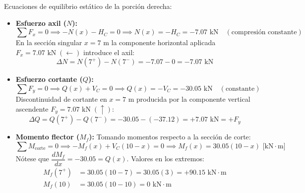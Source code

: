 Ecuaciones de equilibrio estático de la porción derecha:
\begin{itemize}
    \item \textbf{Esfuerzo axil ($N$):}
          \begin{equation}
              \sum F_x = 0 \implies -N(x) - H_C = 0 \implies \boxed{N(x) = -H_C = -7.07\text{ kN}} \quad (\text{compresión constante})
          \end{equation}
          En la sección singular $x = 7\text{ m}$ la componente horizontal aplicada $F_x = 7.07\text{ kN}\;(\leftarrow)$ introduce el axil:
          \begin{equation}
              \Delta N = N(7^+) - N(7^-) = -7.07 - 0 = -7.07\text{ kN}
          \end{equation}

    \item \textbf{Esfuerzo cortante ($Q$):}
          \begin{equation}
              \sum F_y = 0 \implies Q(x) + V_C = 0 \implies \boxed{Q(x) = -V_C = -30.05\text{ kN}} \quad (\text{constante})
          \end{equation}
          Discontinuidad de cortante en $x = 7\text{ m}$ producida por la componente vertical ascendente $F_y = 7.07\text{ kN}\;(\uparrow)$:
          \begin{equation}
              \Delta Q = Q(7^+) - Q(7^-) = -30.05 - (-37.12) = +7.07\text{ kN} = +F_y
          \end{equation}

    \item \textbf{Momento flector ($M_f$):}
          Tomando momentos respecto a la sección de corte:
          \begin{equation}
              \sum M_{\text{corte}} = 0 \implies -M_f(x) + V_C(10 - x) = 0 \implies \boxed{M_f(x) = 30.05(10 - x)\text{ [kN}\cdot\text{m]}}
          \end{equation}
          Nótese que $\dfrac{dM_f}{dx} = -30.05 = Q(x)$.
          Valores en los extremos:
          \begin{align*}
              M_f(7^+) & = 30.05(10 - 7) = 30.05(3) = \boxed{+90.15\text{ kN}\cdot\text{m}} \\
              M_f(10)  & = 30.05(10 - 10) = \boxed{0\text{ kN}\cdot\text{m}}
          \end{align*}
\end{itemize}


